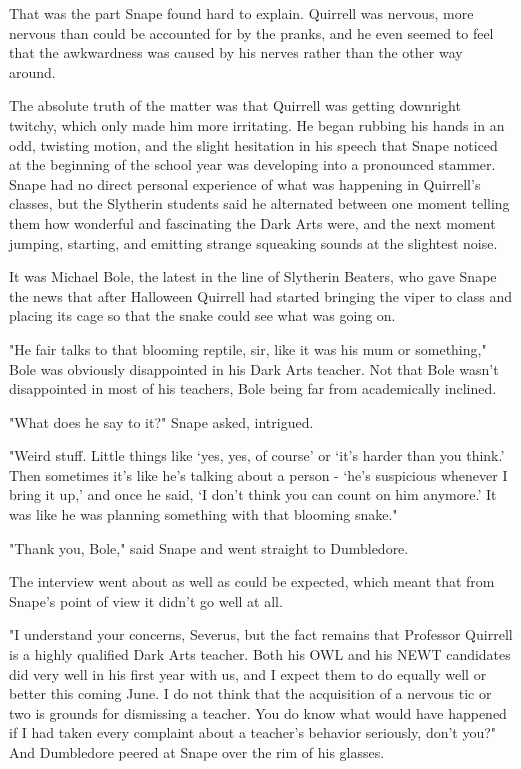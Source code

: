 \documentclass[a4paper,11pt]{article}
\begin{document}
That was the part Snape found hard to explain. Quirrell was nervous, more nervous than could be accounted for by the pranks, and he even seemed to feel that the awkwardness was caused by his nerves rather than the other way around.

The absolute truth of the matter was that Quirrell was getting downright twitchy, which only made him more irritating. He began rubbing his hands in an odd, twisting motion, and the slight hesitation in his speech that Snape noticed at the beginning of the school year was developing into a pronounced stammer. Snape had no direct personal experience of what was happening in Quirrell's classes, but the Slytherin students said he alternated between one moment telling them how wonderful and fascinating the Dark Arts were, and the next moment jumping, starting, and emitting strange squeaking sounds at the slightest noise.

It was Michael Bole, the latest in the line of Slytherin Beaters, who gave Snape the news that after Halloween Quirrell had started bringing the viper to class and placing its cage so that the snake could see what was going on.

"He fair talks to that blooming reptile, sir, like it was his mum or something," Bole was obviously disappointed in his Dark Arts teacher. Not that Bole wasn't disappointed in most of his teachers, Bole being far from academically inclined.

"What does he say to it?" Snape asked, intrigued.

"Weird stuff. Little things like `yes, yes, of course' or `it's harder than you think.' Then sometimes it's like he's talking about a person - `he's suspicious whenever I bring it up,' and once he said, `I don't think you can count on him anymore.' It was like he was planning something with that blooming snake."

"Thank you, Bole," said Snape and went straight to Dumbledore.

The interview went about as well as could be expected, which meant that from Snape's point of view it didn't go well at all.

"I understand your concerns, Severus, but the fact remains that Professor Quirrell is a highly qualified Dark Arts teacher. Both his OWL and his NEWT candidates did very well in his first year with us, and I expect them to do equally well or better this coming June. I do not think that the acquisition of a nervous tic or two is grounds for dismissing a teacher. You do know what would have happened if I had taken every complaint about a teacher's behavior seriously, don't you?" And Dumbledore peered at Snape over the rim of his glasses.
\end{document}
